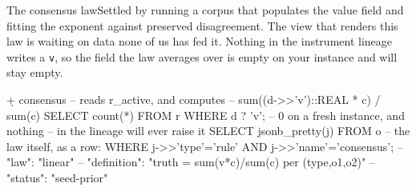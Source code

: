 \begin{Open}{The consensus law}{Settled by running a corpus that populates the value field and fitting the exponent against preserved disagreement.}
The view that renders this law is waiting on data none of us has fed it. Nothing in the instrument lineage writes a \texttt{v}, so the field the law averages over is empty on your instance and will stay empty.
\begin{Check}
\d+ consensus                            -- reads r_active, and computes
                                         -- sum((d->>'v')::REAL * c) / sum(c)
SELECT count(*) FROM r WHERE d ? 'v';    -- 0 on a fresh instance, and nothing
                                         -- in the lineage will ever raise it
SELECT jsonb_pretty(j) FROM o            -- the law itself, as a row:
 WHERE j->>'type'='rule' AND j->>'name'='consensus';
--   "law": "linear"
--   "definition": "truth = sum(v*c)/sum(c) per (type,o1,o2)"
--   "status": "seed-prior"
\end{Check}

\end{Open}
